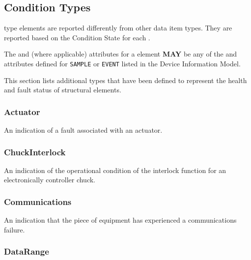 \subsection{Condition Types} \label{sec:Condition Types}


 type elements are reported differently from other data item types. They are reported based on the \gls{Condition State} for each .

The  and  (where applicable) attributes for a  element \textbf{MAY} be any of the  and  attributes defined for \texttt{SAMPLE}  or \texttt{EVENT}   listed in the \gls{Device Information Model}.

This section lists additional  types that have been defined to represent the health and fault status of \glspl{structural element}.


\subsubsection{Actuator}
\label{sec:Actuator}



An indication of a fault associated with an actuator.



\subsubsection{ChuckInterlock}
\label{sec:ChuckInterlock}



An indication of the operational condition of the interlock function for an electronically controller chuck.



\subsubsection{Communications}
\label{sec:Communications}



An indication that the piece of equipment has experienced a communications failure.



\subsubsection{DataRange}
\label{sec:DataRange}



